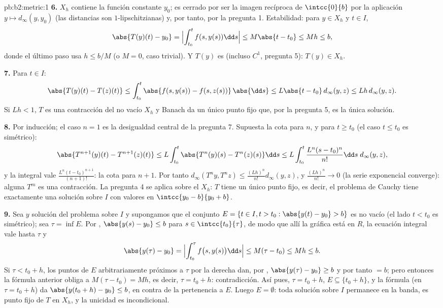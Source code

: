 \begin{solution}{pb:b2:metric:1}
\textbf{6.} $X_h$ contiene la función constante $y_0$; es cerrado
por ser la imagen recíproca de $\intcc{0}{b}$ por la aplicación
 $y \mapsto d_\infty(y, y_0)$ (las distancias son
$1$-lipschitzianas) y, por tanto,  por la pregunta 1.
Estabilidad: para $y \in X_h$ y $t \in I$,
\[
\abs{T(y)(t) - y_0} = \Bigl|\int_{t_0}^{t}f(s, y(s))\dd s\Bigr|
\leq M\abs{t - t_0} \leq Mh \leq b ,
\]
donde el último paso usa $h \leq b/M$ (o $M = 0$, caso trivial). Y
$T(y)$ es  (incluso $C^1$, pregunta 5): $T(y) \in X_h$.

\textbf{7.} Para $t \in I$:
\[
\abs{T(y)(t) - T(z)(t)} \leq \int_{t_0}^{t}\abs{f(s, y(s)) -
f(s, z(s))}\,\abs{\dd s} \leq L\abs{t - t_0}\,d_\infty(y,z)
\leq Lh\,d_\infty(y,z).
\]
Si $Lh < 1$, $T$ es una contracción del  no vacío $X_h$ y
Banach da un único punto fijo que, por la pregunta 5, es la única
solución.

\textbf{8.} Por inducción; el caso $n = 1$ es la desigualdad
central de la pregunta 7. Supuesta la cota para $n$, y para $t
\geq t_0$ (el caso $t \leq t_0$ es simétrico):
\[
\abs{T^{n+1}(y)(t) - T^{n+1}(z)(t)}
\leq L\int_{t_0}^{t}\abs{T^n(y)(s) - T^n(z)(s)}\dd s
\leq L\int_{t_0}^{t}\frac{L^n(s - t_0)^n}{n!}\dd s\;
d_\infty(y,z),
\]
y la integral vale $\frac{L^n(t - t_0)^{n+1}}{(n+1)!}$: la cota
para $n + 1$. Por tanto $d_\infty(T^n y, T^n z) \leq
\frac{(Lh)^n}{n!}d_\infty(y, z)$, y $\frac{(Lh)^n}{n!} \to 0$
(la serie exponencial converge): alguna $T^m$ es una contracción.
La pregunta 4 se aplica sobre el  $X_h$: $T$ tiene un
único punto fijo, es decir, el problema de Cauchy tiene
exactamente una solución sobre $I$ con valores en $\intcc{y_0 -
b}{y_0 + b}$.

\textbf{9.} Sea $y$ solución del problema sobre $I$ y supongamos
que el conjunto $E = \{t \in I, t > t_0 : \abs{y(t) - y_0} > b\}$
es no vacío (el lado $t < t_0$ es simétrico); sea $\tau = \inf E$.
Por , $\abs{y(s) - y_0} \leq b$ para $s \in
\intcc{t_0}{\tau}$, de modo que allí la gráfica está en $R$, la
ecuación integral vale hasta $\tau$ y
\[
\abs{y(\tau) - y_0} = \Bigl|\int_{t_0}^{\tau}f\bigl(s,
y(s)\bigr)\dd s\Bigr| \leq M(\tau - t_0) \leq Mh \leq b .
\]
Si $\tau < t_0 + h$, los puntos de $E$ arbitrariamente próximos a
$\tau$ por la derecha dan, por , $\abs{y(\tau) - y_0}
\geq b$ y por tanto $= b$; pero entonces la fórmula anterior
obliga a $M(\tau - t_0) = Mh$, es decir, $\tau = t_0 + h$:
contradicción. Así pues, $\tau = t_0 + h$, $E \subseteq \{t_0 +
h\}$, y la fórmula (en $\tau = t_0 + h$) da $\abs{y(t_0 + h) -
y_0} \leq b$, en contra de la pertenencia a $E$. Luego $E =
\emptyset$: toda solución sobre $I$ permanece en la banda, es
punto fijo de $T$ en $X_h$, y la unicidad es incondicional.


\end{solution}
